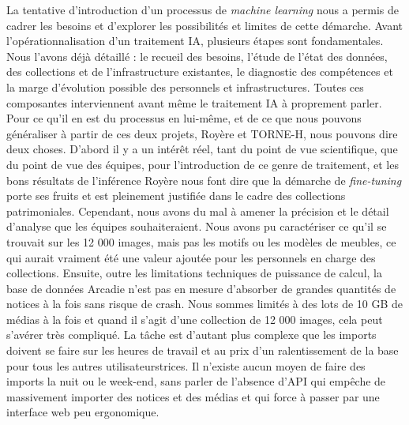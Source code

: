 La tentative d'introduction d'un processus de \textit{machine learning} nous a permis de cadrer les besoins et d'explorer les possibilités et limites de cette démarche. Avant l'opérationnalisation d'un traitement IA, plusieurs étapes sont fondamentales. Nous l'avons déjà détaillé : le recueil des besoins, l'étude de l'état des données, des collections et de l'infrastructure existantes, le diagnostic des compétences et la marge d'évolution possible des personnels et infrastructures. Toutes ces composantes interviennent avant même le traitement IA à proprement parler. Pour ce qu'il en est du processus en lui-même, et de ce que nous pouvons généraliser à partir de ces deux projets, Royère et TORNE-H, nous pouvons dire deux choses. D'abord il y a un intérêt réel, tant du point de vue scientifique, que du point de vue des équipes, pour l'introduction de ce genre de traitement, et les bons résultats de l'inférence Royère nous font dire que la démarche de \textit{fine-tuning} porte ses fruits et est pleinement justifiée dans le cadre des collections patrimoniales. Cependant, nous avons du mal à amener la précision et le détail d'analyse que les équipes souhaiteraient. Nous avons pu caractériser ce qu'il se trouvait sur les 12 000 images, mais pas les motifs ou les modèles de meubles, ce qui aurait vraiment été une valeur ajoutée pour les personnels en charge des collections. Ensuite, outre les limitations techniques de puissance de calcul, la base de données Arcadie n'est pas en mesure d'absorber de grandes quantités de notices à la fois sans risque de crash. Nous sommes limités à des lots de 10 GB de médias à la fois et quand il s'agit d'une collection de 12 000 images, cela peut s'avérer très compliqué. La tâche est d'autant plus complexe que les imports doivent se faire sur les heures de travail et au prix d'un ralentissement de la base pour tous les autres utilisateurs\wokisme trices. Il n'existe aucun moyen de faire des imports la nuit ou le week-end, sans parler de l'absence d'API qui empêche de massivement importer des notices et des médias et qui force à passer par une interface web peu ergonomique. 

